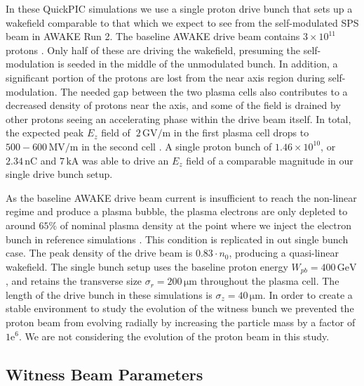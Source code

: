\documentclass[aps,prstab,reprint,amsmath,amssymb,groupedaddress]{revtex4-1}
\newcommand{\unit}[1]{\,\mathrm{#1}}
\newcommand{\funit}[2]{\,\mathrm{#1}/\mathrm{#2}}
\newcommand{\mexp}[1]{\mathrm{e}^{#1}}
\newcommand{\nexp}[1]{\times 10^{#1}}
\begin{document}
In these QuickPIC simulations we use a single proton drive bunch that sets up a wakefield comparable to that which we
expect to see from the self-modulated SPS beam in AWAKE Run 2. The baseline AWAKE drive beam contains $3\nexp{11}$
protons \cite{gschwendtner:2016}. Only half of these are driving the wakefield, presuming the self-modulation is seeded
in the middle of the unmodulated bunch. In addition, a significant portion of the protons are lost from the near axis
region during self-modulation. The needed gap between the two plasma cells also contributes to a decreased density of
protons near the axis, and some of the field is drained by other protons seeing an accelerating phase within the drive
beam itself. In total, the expected peak $E_{z}$ field of $~2\funit{GV}{m}$ in the first plasma cell drops to
$500-600\funit{MV}{m}$ in the second cell \cite{awake_collaboration:2016}. A single proton bunch of $1.46\nexp{10}$,
or $2.34\unit{nC}$ and $7\unit{kA}$ was able to drive an $E_{z}$ field of a comparable magnitude in our single drive
bunch setup.

As the baseline AWAKE drive beam current is insufficient to reach the non-linear regime and produce a plasma bubble, the
plasma electrons are only depleted to around $65\%$ of nominal plasma density at the point where we inject the electron
bunch in reference simulations \cite{awake_collaboration:2016}. This condition is replicated in out single bunch case.
The peak density of the drive beam is $0.83\cdot n_{0}$, producing a quasi-linear wakefield. The single bunch setup uses
the baseline proton energy $W_{pb} = 400\unit{GeV}$, and retains the transverse size $\sigma_{r} = 200\unit{\mu m}$
throughout the plasma cell. The length of the drive bunch in these simulations is $\sigma_{z} = 40\unit{\mu m}$.
In order to create a stable environment to study the evolution of the witness bunch we prevented the proton beam from
evolving radially by increasing the particle mass by a factor of $1\mexp{6}$. We are not considering the evolution of
the proton beam in this study.

\subsection[\label{S:M:Setup}]{Witness Beam Parameters}
\end{document}
